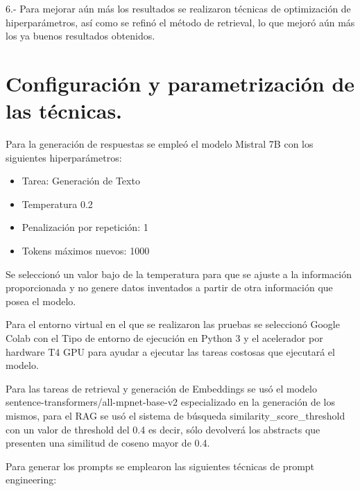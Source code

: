 6.- Para mejorar aún más los resultados se realizaron técnicas de optimización de hiperparámetros, así como se refinó el método de retrieval, lo que mejoró aún más los ya buenos resultados obtenidos.


\section{Configuración y parametrización de las técnicas.}

Para la generación de respuestas se empleó el modelo Mistral 7B con los siguientes hiperparámetros: 

\begin{itemize}

    \item Tarea: Generación de Texto
    \item Temperatura 0.2
    \item Penalización por repetición: 1
    \item Tokens máximos nuevos: 1000

\end{itemize}

Se seleccionó un valor bajo de la temperatura para que se ajuste a la información proporcionada y no genere datos inventados a partir de otra información que posea el modelo.


Para el entorno virtual en el que se realizaron las pruebas se seleccionó Google Colab con el Tipo de entorno de ejecución en Python 3 y el acelerador por hardware T4 GPU para ayudar a ejecutar las tareas costosas que ejecutará el modelo.

Para las tareas de retrieval y generación de Embeddings se usó el modelo sentence-transformers/all-mpnet-base-v2 especializado en la generación de los mismos, para el RAG se usó el sistema de búsqueda similarity\_score\_threshold con un valor de threshold del 0.4 es decir, sólo devolverá los abstracts que presenten una similitud de coseno mayor de 0.4.

Para generar los prompts se emplearon las siguientes técnicas de prompt engineering:

